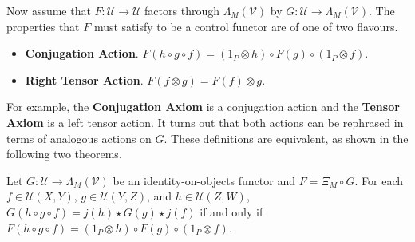 Now assume that $F: \mathcal{U} \to \mathcal{U}$ factors through $\Lambda_M( \mathcal{V} )$ by $G: \mathcal{U} \to \Lambda_M( \mathcal{V} )$.
The properties that $F$ must satisfy to be a control functor are of one of two flavours.
\begin{itemize}
\item \textbf{Conjugation Action}.
      $F( h \circ g \circ f ) = ( 1_P \otimes h ) \circ F( g ) \circ ( 1_P \otimes f )$.
\item \textbf{Right Tensor Action}.
      $F( f \otimes g ) = F( f ) \otimes g$.
\end{itemize}
For example, the \textbf{Conjugation Axiom} is a conjugation action and the \textbf{Tensor Axiom} is a left tensor action.
It turns out that both actions can be rephrased in terms of analogous actions on $G$.
These definitions are equivalent, as shown in the following two theorems.

\begin{thm}
    \label{Thm:ConjAction}
    Let $G: \mathcal{U} \to \Lambda_M( \mathcal{V} )$ be an identity-on-objects functor and $F = \Xi_M \circ G$.
    For each $f \in \mathcal{U}( X, Y )$, $g \in \mathcal{U}( Y, Z )$, and $h \in \mathcal{U}( Z, W )$, $G( h \circ g \circ f ) = j( h ) \star G( g ) \star j( f )$ if and only if $F( h \circ g \circ f ) = ( 1_P \otimes h ) \circ F( g ) \circ ( 1_P \otimes f )$.
\end{thm}

